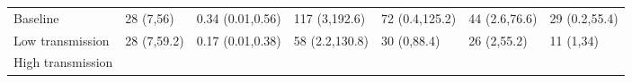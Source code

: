 \documentclass[
]{article}
\begin{document}
\begin{longtable}[]{@{}lllllll@{}}
\midrule
\endhead
\begin{minipage}[t]{0.18\columnwidth}\raggedright
Baseline\strut
\end{minipage} & \begin{minipage}[t]{0.12\columnwidth}\raggedright
28 (7,56)\strut
\end{minipage} & \begin{minipage}[t]{0.10\columnwidth}\raggedright
0.34 (0.01,0.56)\strut
\end{minipage} & \begin{minipage}[t]{0.11\columnwidth}\raggedright
117 (3,192.6)\strut
\end{minipage} & \begin{minipage}[t]{0.11\columnwidth}\raggedright
72 (0.4,125.2)\strut
\end{minipage} & \begin{minipage}[t]{0.09\columnwidth}\raggedright
44 (2.6,76.6)\strut
\end{minipage} & \begin{minipage}[t]{0.10\columnwidth}\raggedright
29 (0.2,55.4)\strut
\end{minipage}\tabularnewline
\begin{minipage}[t]{0.18\columnwidth}\raggedright
Low transmission\strut
\end{minipage} & \begin{minipage}[t]{0.12\columnwidth}\raggedright
28 (7,59.2)\strut
\end{minipage} & \begin{minipage}[t]{0.10\columnwidth}\raggedright
0.17 (0.01,0.38)\strut
\end{minipage} & \begin{minipage}[t]{0.11\columnwidth}\raggedright
58 (2.2,130.8)\strut
\end{minipage} & \begin{minipage}[t]{0.11\columnwidth}\raggedright
30 (0,88.4)\strut
\end{minipage} & \begin{minipage}[t]{0.09\columnwidth}\raggedright
26 (2,55.2)\strut
\end{minipage} & \begin{minipage}[t]{0.10\columnwidth}\raggedright
11 (1,34)\strut
\end{minipage}\tabularnewline
\begin{minipage}[t]{0.18\columnwidth}\raggedright
High transmission\strut
\end{minipage} & \begin{minipage}[t]{0.12\columnwidth}\raggedright

\end{minipage}
\end{longtable}
\end{document}
